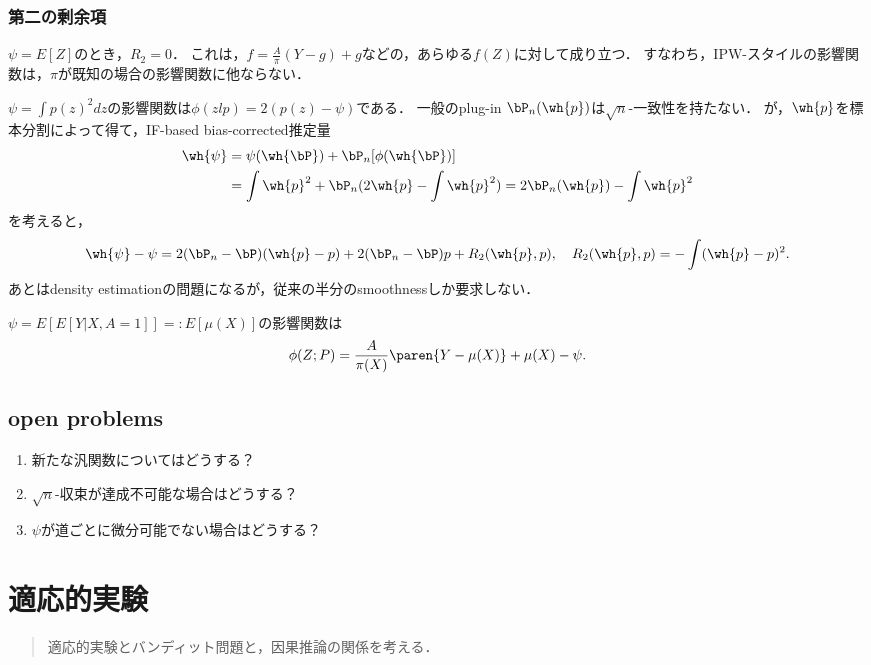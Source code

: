 \documentclass[uplatex,dvipdfmx]{jsreport}
\begin{document}
\subsection{第二の剰余項}

\begin{example}
    $\psi=E[Z]$のとき，$R_2=0$．
    これは，$f=\frac{A}{\pi}(Y-g)+g$などの，あらゆる$f(Z)$に対して成り立つ．
    すなわち，IPW-スタイルの影響関数は，$\pi$が既知の場合の影響関数に他ならない．
\end{example}

\begin{example}
    $\psi=\int p(z)^2dz$の影響関数は$\phi(zlp)=2(p(z)-\psi)$である．
    一般のplug-in $\bP_n(\wh{p})$は$\sqrt{n}$-一致性を持たない．
    が，$\wh{p}$を標本分割によって得て，IF-based bias-corrected推定量
    \begin{align*}
        \wh{\psi}&=\psi(\wh{\bP})+\bP_n[\phi(\wh{\bP})]\\
        &=\int\wh{p}^2+\bP_n(2\wh{p}-\int\wh{p}^2)=2\bP_n(\wh{p})-\int\wh{p}^2
    \end{align*}
    を考えると，
    \[\wh{\psi}-\psi=2(\bP_n-\bP)(\wh{p}-p)+2(\bP_n-\bP)p+R_2(\wh{p},p),\quad R_2(\wh{p},p)=-\int(\wh{p}-p)^2.\]
    あとはdensity estimationの問題になるが，従来の半分のsmoothnessしか要求しない．
\end{example}

\begin{example}
    $\psi=E[E[Y|X,A=1]]=:E[\mu(X)]$の影響関数は
    \[\phi(Z;P)=\frac{A}{\pi(X)}\paren{Y-\mu(X)}+\mu(X)-\psi.\]
\end{example}

\section{open problems}

\begin{enumerate}
    \item 新たな汎関数についてはどうする？
    \item $\sqrt{n}$-収束が達成不可能な場合はどうする？
    \item $\psi$が道ごとに微分可能でない場合はどうする？
\end{enumerate}

\chapter{適応的実験}

\begin{quotation}
    適応的実験とバンディット問題と，因果推論の関係を考える．
\end{quotation}
\end{document}
